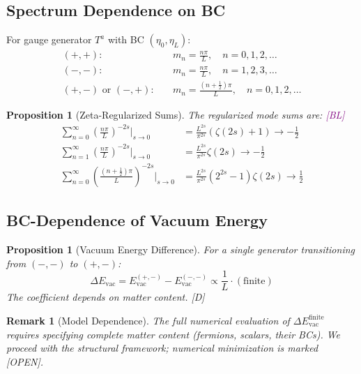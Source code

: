\documentclass[11pt,a4paper]{article}
\newtheorem{proposition}[theorem]{Proposition}
\newtheorem{remark}[theorem]{Remark}
\newcommand{\tagD}{\textcolor{blue!70!black}{[D]}}
\newcommand{\tagBL}{\textcolor{purple}{[BL]}}
\newcommand{\tagOPEN}{\textcolor{red!70!black}{[OPEN]}}
\begin{document}
\subsection{Spectrum Dependence on BC}

For gauge generator $T^a$ with BC $(\eta_0, \eta_L)$:
\begin{align}
\label{eq:spec-pp}
(+,+): \quad & m_n = \frac{n\pi}{L}, \quad n = 0, 1, 2, \ldots \\
\label{eq:spec-mm}
(-,-): \quad & m_n = \frac{n\pi}{L}, \quad n = 1, 2, 3, \ldots \\
\label{eq:spec-pm}
(+,-) \text{ or } (-,+): \quad & m_n = \frac{(n + \tfrac{1}{2})\pi}{L}, \quad n = 0, 1, 2, \ldots
\end{align}

\begin{proposition}[Zeta-Regularized Sums]
\label{prop:zeta}
The regularized mode sums are: \tagBL
\begin{align}
\label{eq:zeta-pp}
\sum_{n=0}^\infty \left(\frac{n\pi}{L}\right)^{-2s}\bigg|_{s \to 0} &=
\frac{L^{2s}}{\pi^{2s}} \left(\zeta(2s) + 1\right) \to -\frac{1}{2} \\
\label{eq:zeta-mm}
\sum_{n=1}^\infty \left(\frac{n\pi}{L}\right)^{-2s}\bigg|_{s \to 0} &=
\frac{L^{2s}}{\pi^{2s}} \zeta(2s) \to -\frac{1}{2} \\
\label{eq:zeta-mixed}
\sum_{n=0}^\infty \left(\frac{(n+\tfrac{1}{2})\pi}{L}\right)^{-2s}\bigg|_{s \to 0} &=
\frac{L^{2s}}{\pi^{2s}} (2^{2s} - 1)\zeta(2s) \to \frac{1}{2}
\end{align}
\end{proposition}

\subsection{BC-Dependence of Vacuum Energy}

\begin{proposition}[Vacuum Energy Difference]
\label{prop:vac-diff}
For a single generator transitioning from $(-,-)$ to $(+,-)$:
\begin{equation}
\label{eq:vac-diff}
\Delta E_{\text{vac}} = E_{\text{vac}}^{(+,-)} - E_{\text{vac}}^{(-,-)} \propto
\frac{1}{L} \cdot (\text{finite})
\end{equation}
The coefficient depends on matter content. \tagD
\end{proposition}

\begin{remark}[Model Dependence]
The full numerical evaluation of $\Delta E_{\text{vac}}^{\text{finite}}$ requires
specifying complete matter content (fermions, scalars, their BCs). We proceed
with the structural framework; numerical minimization is marked \tagOPEN.
\end{remark}
\end{document}
